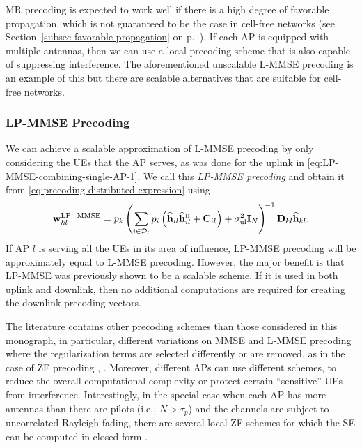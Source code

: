 MR precoding is expected to work well if there is a high degree of favorable propagation, which is not guaranteed to be the case in cell-free networks (see Section~\ref{subsec-favorable-propagation} on p.~\pageref{subsec-favorable-propagation}). If each AP is equipped with multiple antennas, then we can use a local precoding scheme that is also capable of suppressing interference. The aforementioned unscalable L-MMSE precoding is an example of this but there are scalable alternatives that are suitable for cell-free networks.



\subsubsection{LP-MMSE Precoding}

We can achieve a scalable approximation of L-MMSE precoding by only considering the UEs that the AP serves, as was done for the uplink in \eqref{eq:LP-MMSE-combining-single-AP-1}. We call this \emph{LP-MMSE precoding} and obtain it from \eqref{eq:precoding-distributed-expression} using
\begin{equation} \label{eq:LP-MMSE-precoding-single-AP-1}
\bar{\vect{w}}_{kl}^{{\rm LP-MMSE}} =  p_{k}  \left( \sum\limits_{i \in \mathcal{D}_l} p_{i} \left( \widehat{\vect{h}}_{il} \widehat{\vect{h}}_{il}^{\Htran} + \vect{C}_{il} \right) + \sigmaUL  \vect{I}_{N} \right)^{\!-1}   \vect{D}_{kl} \widehat{\vect{h}}_{kl}.
\end{equation}
If AP $l$ is serving all the UEs in its area of influence, LP-MMSE precoding will be approximately equal to L-MMSE precoding. However, the major benefit is that LP-MMSE was previously shown to be a scalable scheme. If it is used in both uplink and downlink, then no additional  computations are required for creating the downlink precoding vectors.


\begin{remark}
The literature contains other precoding schemes than those considered in this monograph, in particular, different variations on MMSE and L-MMSE precoding where the regularization terms are selected differently or are removed, as in the case of ZF precoding \cite{Interdonato2020a}, \cite{Nguyen2017a}. Moreover, different APs can use different schemes, to reduce the overall computational complexity or protect certain ``sensitive'' UEs from interference. Interestingly, in the special case when each AP has more antennas than there are pilots (i.e., $N> \tau_p$) and the channels are subject to uncorrelated Rayleigh fading, there are several local ZF schemes for which the SE can be computed in closed form \cite{Interdonato2020a}.
\end{remark}



